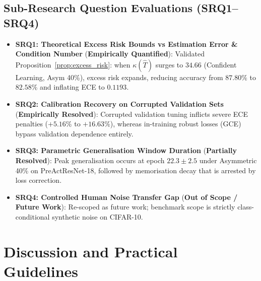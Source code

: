 \documentclass[10pt,twocolumn]{article}
\theoremstyle{definition}
\begin{document}
\subsection{Sub-Research Question Evaluations (SRQ1--SRQ4)}
\begin{itemize}
    \item \textbf{SRQ1: Theoretical Excess Risk Bounds vs Estimation Error \& Condition Number} (\textbf{Empirically Quantified}): Validated Proposition~\ref{prop:excess_risk}: when $\kappa(\hat{T})$ surges to $34.66$ (Confident Learning, Asym 40\%), excess risk expands, reducing accuracy from $87.80\%$ to $82.58\%$ and inflating ECE to $0.1193$.
    \item \textbf{SRQ2: Calibration Recovery on Corrupted Validation Sets} (\textbf{Empirically Resolved}): Corrupted validation tuning inflicts severe ECE penalties ($+5.16\%$ to $+16.63\%$), whereas in-training robust losses (GCE) bypass validation dependence entirely.
    \item \textbf{SRQ3: Parametric Generalisation Window Duration} (\textbf{Partially Resolved}): Peak generalisation occurs at epoch $22.3 \pm 2.5$ under Asymmetric 40\% on PreActResNet-18, followed by memorisation decay that is arrested by loss correction.
    \item \textbf{SRQ4: Controlled Human Noise Transfer Gap} (\textbf{Out of Scope / Future Work}): Re-scoped as future work; benchmark scope is strictly class-conditional synthetic noise on CIFAR-10.
\end{itemize}

\section{Discussion and Practical Guidelines}
\end{document}
